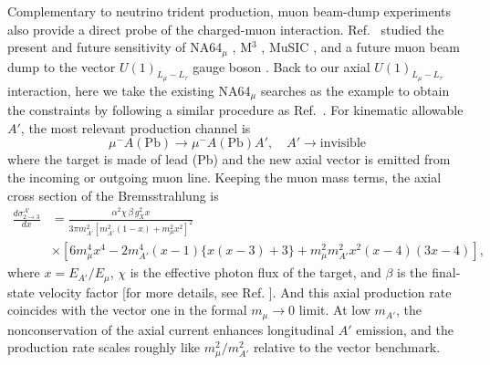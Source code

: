 \documentclass[onecolumn, aps, nofootinbib, prd, preprint, floats, floatfix, amsmath, amssymb, superscriptaddress, preprintnumbers]{revtex4-1}
\begin{document}
Complementary to neutrino trident production, muon beam-dump experiments also provide a direct probe of the charged-muon interaction. Ref.~\cite{Chakraborty:2025jbd} studied the present and future sensitivity of NA64$_\mu$ \cite{NA64:2024nwj}, M$^3$ \cite{Kahn:2018cqs}, MuSIC \cite{Acosta:2021qpx,Acosta:2022ejc}, and a future muon beam dump to the vector $U(1)_{L_\mu-L_\tau}$ gauge boson \cite{Cesarotti:2022ttv}. Back to our axial $U(1)_{L_\mu-L_\tau}$ interaction, here we take the existing NA64$_\mu$ searches as the example to obtain the constraints by following a similar procedure as Ref.~\cite{Chakraborty:2025jbd}.
For kinematic allowable $A'$, the most relevant production channel is
\begin{equation}
\mu^- A(\text{Pb}) \to \mu^- A(\text{Pb}) A', \quad A' \to \text{invisible}
\label{eq:NA64production}
\end{equation}
where the target is made of lead (Pb) \cite{andreev2024exploration} and the new axial vector is emitted from the incoming or outgoing muon line. 
Keeping the muon mass terms, the axial cross section of the Bremsstrahlung is \cite{Chakraborty:2025jbd}
\begin{equation}
\begin{aligned}
\frac{d\sigma^{A'}_{2\to 3}}{dx}
&=\frac{\alpha^2\chi\,\beta\,g_X^2 x}{3\pi m_{A'}^2\left[m_{A'}^2(1-x)+m_\mu^2x^2\right]^2} \\
&\times\left[ 6m_\mu^4x^4 -2m_{A'}^4(x-1)\{x(x-3)+3\} +m_\mu^2m_{A'}^2x^2(x-4)(3x-4) \right],
\label{eq:beamdump-axial-spectrum}
\end{aligned}
\end{equation}
where $x=E_{A'}/E_\mu$, $\chi$ is the effective photon flux of the target, and $\beta$ is the final-state velocity factor [for more details, see Ref. \cite{Chakraborty:2025jbd}].
And this axial production rate coincides with the vector one in the formal $m_\mu\to0$ limit. At low $m_{A'}$, the nonconservation of the axial current enhances longitudinal $A'$ emission, and the production rate scales roughly like $m_\mu^2/m_{A'}^2$ relative to the vector benchmark.
\end{document}
